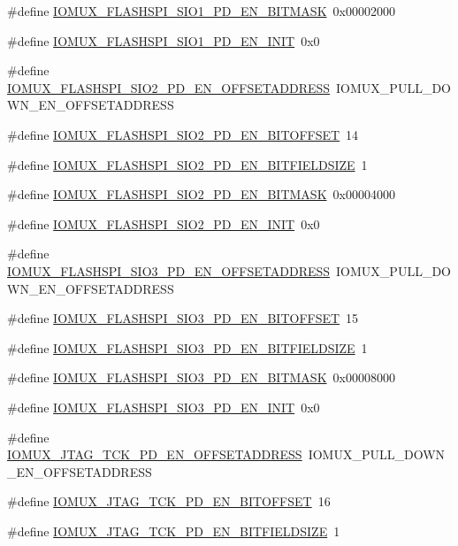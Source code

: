 \begin{DoxyCompactItemize}
\item 
\#define \hyperlink{a00560_a2718fe96804aab8792028db077e45375}{IOMUX\_\-FLASHSPI\_\-SIO1\_\-PD\_\-EN\_\-BITMASK}~0x00002000
\item 
\#define \hyperlink{a00560_a1d3fbaadb5e18c52d869f61412713a17}{IOMUX\_\-FLASHSPI\_\-SIO1\_\-PD\_\-EN\_\-INIT}~0x0
\item 
\#define \hyperlink{a00560_a2c09c1fe607af6c733973011c491cdec}{IOMUX\_\-FLASHSPI\_\-SIO2\_\-PD\_\-EN\_\-OFFSETADDRESS}~IOMUX\_\-PULL\_\-DOWN\_\-EN\_\-OFFSETADDRESS
\item 
\#define \hyperlink{a00560_ab78339d25429bba9d347f99d930484b7}{IOMUX\_\-FLASHSPI\_\-SIO2\_\-PD\_\-EN\_\-BITOFFSET}~14
\item 
\#define \hyperlink{a00560_adff4b2276d068841e37eb1e91c218706}{IOMUX\_\-FLASHSPI\_\-SIO2\_\-PD\_\-EN\_\-BITFIELDSIZE}~1
\item 
\#define \hyperlink{a00560_a3eeecc1c82b4aa34852c3a341b1fc588}{IOMUX\_\-FLASHSPI\_\-SIO2\_\-PD\_\-EN\_\-BITMASK}~0x00004000
\item 
\#define \hyperlink{a00560_a62857924d290d7be69521e84ca940d24}{IOMUX\_\-FLASHSPI\_\-SIO2\_\-PD\_\-EN\_\-INIT}~0x0
\item 
\#define \hyperlink{a00560_a26e48fed7649534e6c02afdfa984e078}{IOMUX\_\-FLASHSPI\_\-SIO3\_\-PD\_\-EN\_\-OFFSETADDRESS}~IOMUX\_\-PULL\_\-DOWN\_\-EN\_\-OFFSETADDRESS
\item 
\#define \hyperlink{a00560_ac6c3fdded610df31da9dbd2c1ad49fbd}{IOMUX\_\-FLASHSPI\_\-SIO3\_\-PD\_\-EN\_\-BITOFFSET}~15
\item 
\#define \hyperlink{a00560_a603dffff90990ac022b19a14f81dfad5}{IOMUX\_\-FLASHSPI\_\-SIO3\_\-PD\_\-EN\_\-BITFIELDSIZE}~1
\item 
\#define \hyperlink{a00560_a76225b72a18bef408ab7e6d1a3f69813}{IOMUX\_\-FLASHSPI\_\-SIO3\_\-PD\_\-EN\_\-BITMASK}~0x00008000
\item 
\#define \hyperlink{a00560_a6e4ee0034758167481f6d886f33b3160}{IOMUX\_\-FLASHSPI\_\-SIO3\_\-PD\_\-EN\_\-INIT}~0x0
\item 
\#define \hyperlink{a00560_ac1f59a9dfbafa7c58210f6b89fb31b70}{IOMUX\_\-JTAG\_\-TCK\_\-PD\_\-EN\_\-OFFSETADDRESS}~IOMUX\_\-PULL\_\-DOWN\_\-EN\_\-OFFSETADDRESS
\item 
\#define \hyperlink{a00560_a5d43ea3ee4215289de17abfcd0f83ba0}{IOMUX\_\-JTAG\_\-TCK\_\-PD\_\-EN\_\-BITOFFSET}~16
\item 
\#define \hyperlink{a00560_a5b6421bdbb6bb614bf2e2ef4a776baf9}{IOMUX\_\-JTAG\_\-TCK\_\-PD\_\-EN\_\-BITFIELDSIZE}~1
\item 

\end{DoxyCompactItemize}
